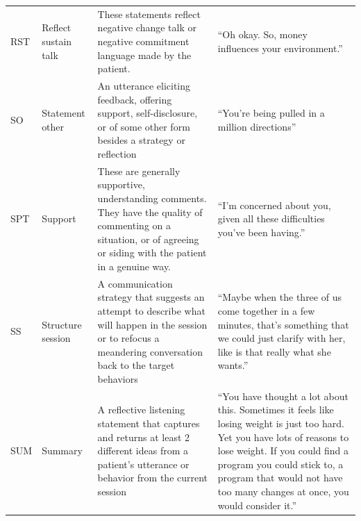 \begin{small}
\begin{longtable}{p{1.3cm}p{2cm}p{5cm}p{4.8cm}}
RST & Reflect sustain talk & These statements reflect negative change talk or negative commitment language made by the patient. & ``Oh okay.  So, money influences your environment.''\\
SO & Statement other & An utterance eliciting feedback, offering support, self-disclosure, or of some other form besides a strategy or reflection & ``You're being pulled in a million directions''\\
SPT & Support & These are generally supportive, understanding comments. They have the quality of commenting on a situation, or of agreeing or siding with the patient in a genuine way. & ``I'm concerned about you, given all these difficulties you've been having.''\\
SS & Structure session & A communication strategy that suggests an attempt to describe what will happen in the session or to refocus a meandering conversation back to the target behaviors & ``Maybe when the three of us come together in a few minutes, that's something that we could just clarify with her, like is that really what she wants.''\\
SUM & Summary & A reflective listening statement that captures and returns at least 2 different ideas from a patient's utterance or behavior from the current session & ``You have thought a lot about this.  Sometimes it feels like losing weight is just too hard.  Yet you have lots of reasons to lose weight.  If you could find a program you could stick to, a program that would not have too many changes at once, you would consider it.''\\


\end{longtable}
\end{small}
